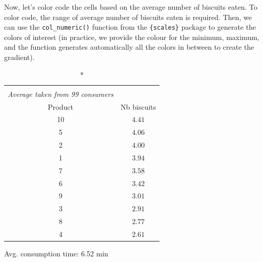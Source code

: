 \documentclass[
]{krantz}
\makeatletter
\newenvironment{Shaded}{\begin{snugshade}}{\end{snugshade}}
\newcommand{\AttributeTok}[1]{\textcolor[rgb]{0.61,0.61,0.61}{#1}}
\newcommand{\FloatTok}[1]{\textcolor[rgb]{0.06,0.06,0.06}{#1}}
\newcommand{\FunctionTok}[1]{\textcolor[rgb]{0,0,0}{#1}}
\newcommand{\NormalTok}[1]{#1}
\newcommand{\OtherTok}[1]{\textcolor[rgb]{0.37,0.37,0.37}{#1}}
\newcommand{\SpecialCharTok}[1]{\textcolor[rgb]{0,0,0}{#1}}
\newcommand{\StringTok}[1]{\textcolor[rgb]{0.5,0.5,0.5}{#1}}
\newenvironment{kframe}{%
\medskip{}
\setlength{\fboxsep}{.8em}
 \def\at@end@of@kframe{}%
 \ifinner\ifhmode%
  \def\at@end@of@kframe{\end{minipage}}%
  \begin{minipage}{\columnwidth}%
 \fi\fi%
 \def\FrameCommand##1{\hskip\@totalleftmargin \hskip-\fboxsep
 \colorbox{shadecolor}{##1}\hskip-\fboxsep
     \hskip-\linewidth \hskip-\@totalleftmargin \hskip\columnwidth}%
 \MakeFramed {\advance\hsize-\width
   \@totalleftmargin\z@ \linewidth\hsize
   \@setminipage}}%
 {\par\unskip\endMakeFramed%
 \at@end@of@kframe}
\renewenvironment{Shaded}{\begin{kframe}}{\end{kframe}}
\makeatother
\begin{document}
Now, let's color code the cells based on the average number of biscuits eaten. To color code, the range of average number of biscuits eaten is required. Then, we can use the \texttt{col\_numeric()} function from the \texttt{\{scales\}} package to generate the colors of interest (in practice, we provide the colour for the minimum, maximum, and the function generates automatically all the colors in between to create the gradient).

\begin{Shaded}
\end{Shaded}

\setlength{\LTpost}{0mm}
\begin{longtable}{cc}
\caption*{
{\large \textbf{Number of biscuits eaten}} \\ 
{\small \emph{Average taken from 99 consumers}}
} \\ 
\toprule
Product & Nb biscuits \\ 
\midrule
10 & $4.41$ \\ 
5 & $4.06$ \\ 
2 & $4.00$ \\ 
1 & $3.94$ \\ 
7 & $3.58$ \\ 
6 & $3.42$ \\ 
9 & $3.01$ \\ 
3 & $2.91$ \\ 
8 & $2.77$ \\ 
4 & $2.61$ \\ 
\bottomrule
\end{longtable}
\begin{minipage}{\linewidth}
Avg. consumption time: 6.52 min\\
\end{minipage}
\end{document}
